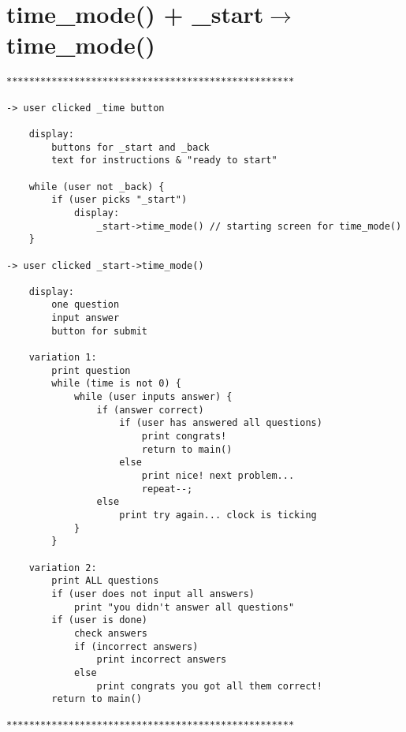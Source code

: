 \documentclass[12pt]{article}
\begin{document}
\section{time\_mode() + \_start$\rightarrow$time\_mode()}
    \begin{verbatim}
***************************************************

-> user clicked _time button 

    display:
        buttons for _start and _back
        text for instructions & "ready to start"
    
    while (user not _back) {    
        if (user picks "_start")
            display:
                _start->time_mode() // starting screen for time_mode()
    }

-> user clicked _start->time_mode()
    
    display:
        one question
        input answer
        button for submit
    
    variation 1:
        print question
        while (time is not 0) {
            while (user inputs answer) {
                if (answer correct)
                    if (user has answered all questions)
                        print congrats!
                        return to main()
                    else
                        print nice! next problem...
                        repeat--;
                else
                    print try again... clock is ticking
            }
        }

    variation 2:
        print ALL questions
        if (user does not input all answers)
            print "you didn't answer all questions"
        if (user is done)
            check answers
            if (incorrect answers)
                print incorrect answers
            else
                print congrats you got all them correct!
        return to main()

***************************************************
    \end{verbatim}
\end{document}
